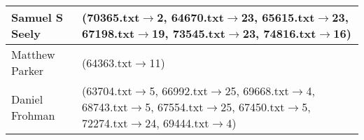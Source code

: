 \begin{table*}
{\begin{tabular}{|p{2cm}|p{15cm}|}
    Samuel S Seely     & (70365.txt$\rightarrow$2, 64670.txt$\rightarrow$23, 65615.txt$\rightarrow$23, 67198.txt$\rightarrow$19, 73545.txt$\rightarrow$23, 74816.txt$\rightarrow$16)                                                                 \\ \hline
    Matthew Parker      & (64363.txt$\rightarrow$11)                                                   \\ \hline
    Daniel Frohman       & (63704.txt$\rightarrow$5, 66992.txt$\rightarrow$25, 69668.txt$\rightarrow$4, 68743.txt$\rightarrow$5, 67554.txt$\rightarrow$25, 67450.txt$\rightarrow$5, 72274.txt$\rightarrow$24, 69444.txt$\rightarrow$4)                                \\ \hline
    \end{tabular}}

\end{table*}


